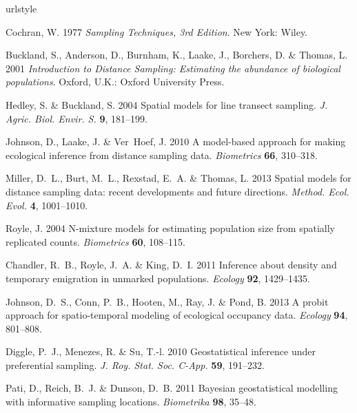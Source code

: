 \documentclass[]{rsos}%
\begin{document}
%
%
\begin{thebibliography}{10}
\expandafter\ifx\csname urlstyle\endcsname\relax
  \providecommand{\doi}[1]{doi:\discretionary{}{}{}#1}\else
  \providecommand{\doi}{doi:\discretionary{}{}{}\begingroup
  \urlstyle{rm}\Url}\fi

Cochran, W. 1977 \emph{Sampling Techniques, 3rd Edition}.
New York: Wiley.

Buckland, S., Anderson, D., Burnham, K., Laake, J., Borchers, D. \& Thomas, L.
  2001 \emph{Introduction to Distance Sampling: Estimating the abundance of
  biological populations}.
  Oxford, U.K.: Oxford University Press.

Hedley, S. \& Buckland, S. 2004 Spatial models for line transect sampling.
 \emph{J. Agric. Biol. Envir. S.} \textbf{9}, 181--199.

Johnson, D., Laake, J. \& Ver~Hoef, J. 2010 A model-based approach for making
  ecological inference from distance sampling data.
 \emph{Biometrics} \textbf{66}, 310--318.

Miller, D.~L., Burt, M.~L., Rexstad, E.~A. \& Thomas, L. 2013 Spatial models
  for distance sampling data: recent developments and future directions.
 \emph{Method. Ecol. Evol.} \textbf{4}, 1001--1010.

Royle, J. 2004 N-mixture models for estimating population size from spatially
  replicated counts.
 \emph{Biometrics} \textbf{60}, 108--115.

Chandler, R.~B., Royle, J.~A. \& King, D.~I. 2011 Inference about density and
  temporary emigration in unmarked populations.
 \emph{Ecology} \textbf{92}, 1429--1435.

Johnson, D.~S., Conn, P.~B., Hooten, M., Ray, J. \& Pond, B. 2013 A probit
  approach for spatio-temporal modeling of ecological occupancy data.
 \emph{Ecology} \textbf{94}, 801--808.

Diggle, P.~J., Menezes, R. \& Su, T.-l. 2010 Geostatistical inference under
  preferential sampling.
 \emph{J. Roy. Stat. Soc. C-App.} \textbf{59}, 191--232.

Pati, D., Reich, B.~J. \& Dunson, D.~B. 2011 Bayesian geostatistical modelling
  with informative sampling locations.
 \emph{Biometrika} \textbf{98}, 35--48.


\end{thebibliography}
\end{document}
